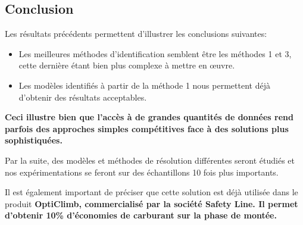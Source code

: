 \documentclass[a0,portrait]{a0poster}
\begin{document}
\begin{multicols}{2}
\section{Conclusion}
\color{Navy} %

Les résultats précédents permettent d'illustrer les conclusions suivantes:
\begin{itemize}
\item Les meilleures méthodes d'identification semblent être les méthodes 1 et 3, cette dernière étant bien plus complexe à mettre en œuvre.
\item Les modèles identifiés à partir de la méthode 1 nous permettent déjà d'obtenir des résultats acceptables.
\end{itemize}
\textbf{Ceci illustre bien que l'accès à de grandes quantités de données rend parfois des approches simples compétitives face à des solutions plus sophistiquées.}
\vspace{1cm}

Par la suite, des modèles et méthodes de résolution différentes seront étudiés et nos expérimentations se feront sur des échantillons 10 fois plus importants.

Il est également important de préciser que cette solution est déjà utilisée dans le produit \textbf{OptiClimb, commercialisé par la société Safety Line. Il permet d'obtenir 10\% d'économies de carburant sur la phase de montée.}

\color{DarkSlateGray} %





\small
\nocite{*} %



\end{multicols}
\end{document}
